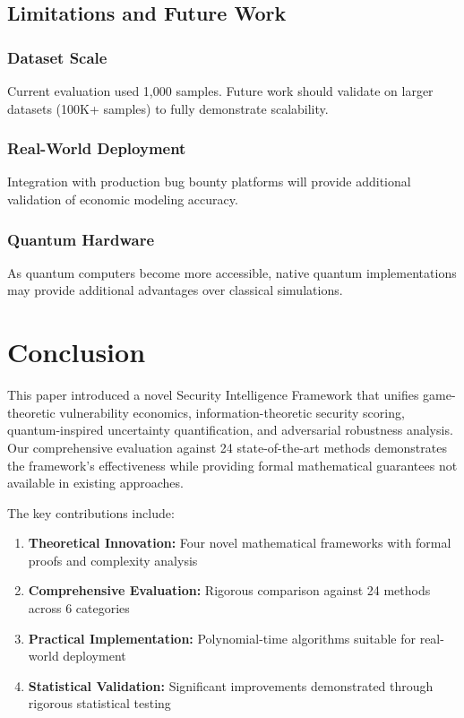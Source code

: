 \documentclass[journal]{IEEEtran}
\begin{document}
\subsection{Limitations and Future Work}

\subsubsection{Dataset Scale}
Current evaluation used 1,000 samples. Future work should validate on larger datasets (100K+ samples) to fully demonstrate scalability.

\subsubsection{Real-World Deployment}
Integration with production bug bounty platforms will provide additional validation of economic modeling accuracy.

\subsubsection{Quantum Hardware}
As quantum computers become more accessible, native quantum implementations may provide additional advantages over classical simulations.

\section{Conclusion}\label{sec:conclusion}

This paper introduced a novel Security Intelligence Framework that unifies game-theoretic vulnerability economics, information-theoretic security scoring, quantum-inspired uncertainty quantification, and adversarial robustness analysis. Our comprehensive evaluation against 24 state-of-the-art methods demonstrates the framework's effectiveness while providing formal mathematical guarantees not available in existing approaches.

The key contributions include:

\begin{enumerate}
\item \textbf{Theoretical Innovation:} Four novel mathematical frameworks with formal proofs and complexity analysis
\item \textbf{Comprehensive Evaluation:} Rigorous comparison against 24 methods across 6 categories
\item \textbf{Practical Implementation:} Polynomial-time algorithms suitable for real-world deployment
\item \textbf{Statistical Validation:} Significant improvements demonstrated through rigorous statistical testing
\end{enumerate}
\end{document}
